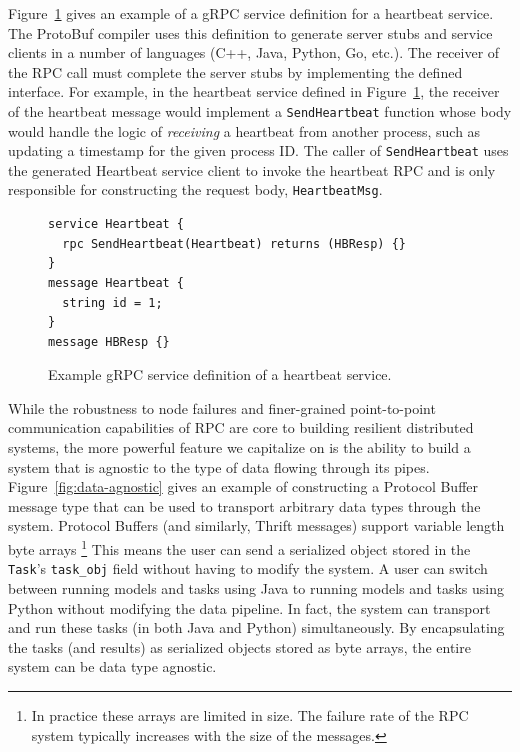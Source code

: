 \documentclass[conference]{IEEEtran}
\begin{document}
Figure~\ref{fig:heartbeat} gives an example of a gRPC service
definition for a heartbeat service. The ProtoBuf compiler uses this definition
to generate server stubs and service clients in a number of languages (C++,
Java, Python, Go, etc.). The receiver of the RPC call must complete the server
stubs by implementing the defined interface. For example, in the heartbeat
service defined in Figure~\ref{fig:heartbeat}, the receiver of the heartbeat
message would implement a \texttt{SendHeartbeat} function whose body would
handle the logic of \emph{receiving} a heartbeat from another process,
such as updating a timestamp for the given process ID. The caller of
\texttt{SendHeartbeat} uses the generated Heartbeat service client to invoke
the heartbeat RPC and is only
responsible for constructing the request body, \texttt{HeartbeatMsg}.

\begin{figure}
  \begin{lstlisting}
service Heartbeat {
  rpc SendHeartbeat(Heartbeat) returns (HBResp) {}
}
message Heartbeat {
  string id = 1;
}
message HBResp {}
\end{lstlisting}
\caption{Example gRPC service definition of a heartbeat service.}
\label{fig:heartbeat}
\end{figure}

While the robustness to node failures and finer-grained point-to-point
communication capabilities of RPC are core to building resilient distributed
systems, the more powerful feature we capitalize on is the ability to build a
system that is agnostic to the type of data flowing through its
pipes. Figure~\ref{fig:data-agnostic} gives an example of constructing a
Protocol Buffer message type that can be used to transport arbitrary data types
through the system. Protocol Buffers (and similarly, Thrift messages) support
variable length byte arrays
\footnote{In practice these arrays are limited in size. The failure rate of the
  RPC system typically increases with the size of the messages.} This means the
user can send a serialized object stored in the \texttt{Task}'s
\texttt{task\_obj} field without having to modify the system.  A user can switch
between running models and tasks using Java to running models and tasks using
Python without modifying the data pipeline. In fact, the system can transport
and run these tasks (in both Java and Python) simultaneously. By encapsulating
the tasks (and results) as serialized objects stored as byte arrays, the entire
system can be data type agnostic.
\end{document}
